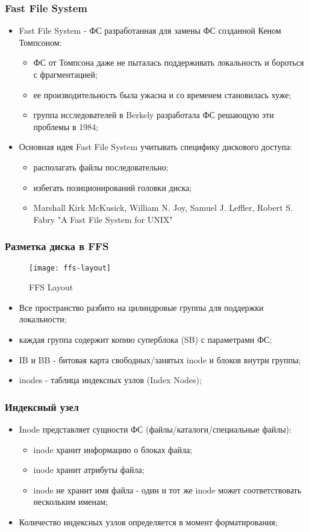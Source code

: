 \begin{frame}
\frametitle{Fast File System}
\begin{itemize}
  \item Fast File System - ФС разработанная для замены ФС созданной Кеном Томпсоном:
    \begin{itemize}
      \item ФС от Томпсона даже не пыталась поддерживать локальность и бороться с фрагментацией;
      \item ее производительность была ужасна и со временем становилась хуже;
      \item группа исследователей в Berkely разработала ФС решающую эти проблемы в 1984;
    \end{itemize}
  \item Основная идея Fast File System учитывать специфику дискового доступа:
    \begin{itemize}
      \item располагать файлы последовательно;
      \item избегать позиционирований головки диска;
      \item Marshall Kirk McKusick, William N. Joy, Samuel J. Leffler, Robert S. Fabry "A Fast File System for UNIX"
    \end{itemize}
\end{itemize}
\end{frame}

\begin{frame}
\frametitle{Разметка диска в FFS}
\begin{figure}
  \centering\texttt{[image: ffs-layout]}
  \caption{FFS Layout}
\end{figure}
\begin{itemize}
  \item Все пространство разбито на цилиндровые группы для поддержки локальности;
  \item каждая группа содержит копию суперблока (SB) с параметрами ФС;
  \item IB и BB - битовая карта свободных/занятых inode и блоков внутри группы;
  \item inodes - таблица индексных узлов (Index Nodes);
\end{itemize}
\end{frame}

\begin{frame}
\frametitle{Индексный узел}
\begin{itemize}
  \item Inode представляет сущности ФС (файлы/каталоги/специальные файлы):
    \begin{itemize}
      \item inode хранит информацию о блоках файла;
      \item inode хранит атрибуты файла;
      \item inode не хранит имя файла - один и тот же inode может соответствовать нескольким именам;
    \end{itemize}
  \item Количество индексных узлов определяется в момент форматирования;
\end{itemize}
\end{frame}

